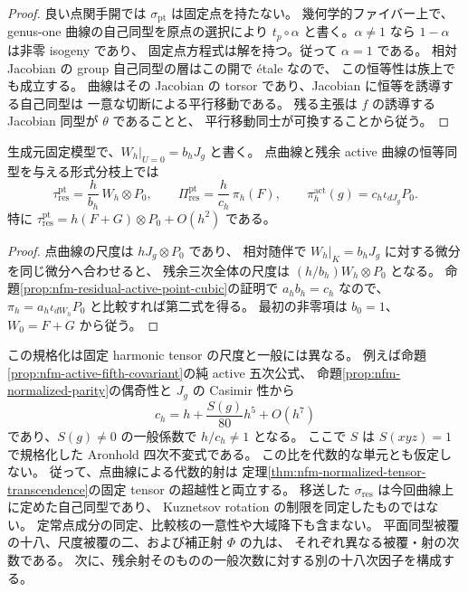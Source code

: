 \begin{proof}
良い点関手開では $\sigma_{\mathrm{pt}}$ は固定点を持たない。
幾何学的ファイバー上で、genus-one 曲線の自己同型を原点の選択により
$t_p\circ\alpha$ と書く。$\alpha\ne1$ なら $1-\alpha$ は非零 isogeny であり、
固定点方程式は解を持つ。従って $\alpha=1$ である。
相対 Jacobian の group 自己同型の層はこの開で étale なので、
この恒等性は族上でも成立する。
曲線はその Jacobian の torsor であり、Jacobian に恒等を誘導する自己同型は
一意な切断による平行移動である。
残る主張は $f$ の誘導する Jacobian 同型が $\theta$ であることと、
平行移動同士が可換することから従う。
\end{proof}


\begin{proposition}
\label{prop:nfm-point-scale-formal-comparison}
生成元固定模型で、$W_h|_{U=0}=b_hJ_g$ と書く。
点曲線と残余 active 曲線の恒等同型を与える形式分枝上では
\begin{equation}\label{eq:nfm-point-scale-formal-leading}
 \tau_{\mathrm{res}}^{\mathrm{pt}}
    =\frac{h}{b_h}\,W_h\otimes P_0,
 \qquad
 \Pi_{\mathrm{res}}^{\mathrm{pt}}
    =\frac{h}{c_h}\,\pi_h(F),
 \qquad
 \pi_h^{\mathrm{act}}(g)=c_h\iota_{dJ_g}P_0.
\end{equation}
特に $\tau_{\mathrm{res}}^{\mathrm{pt}}=h(F+G)\otimes P_0+O(h^2)$ である。
\end{proposition}

\begin{proof}
点曲線の尺度は $hJ_g\otimes P_0$ であり、
相対随伴で $W_h|_K=b_hJ_g$ に対する微分を同じ微分へ合わせると、
残余三次全体の尺度は $(h/b_h)W_h\otimes P_0$ となる。
命題\ref{prop:nfm-residual-active-point-cubic}の証明で
$a_hb_h=c_h$ なので、$\pi_h=a_h\iota_{dW_h}P_0$ と比較すれば第二式を得る。
最初の非零項は $b_0=1$、$W_0=F+G$ から従う。
\end{proof}

この規格化は固定 harmonic tensor の尺度と一般には異なる。
例えば命題\ref{prop:nfm-active-fifth-covariant}の純 active 五次公式、
命題\ref{prop:nfm-normalized-parity}の偶奇性と $J_g$ の Casimir 性から
\[
 c_h=h+\frac{S(g)}{80}h^5+O(h^7)
\]
であり、$S(g)\ne0$ の一般係数で $h/c_h\ne1$ となる。
ここで $S$ は $S(xyz)=1$ で規格化した Aronhold 四次不変式である。
この比を代数的な単元とも仮定しない。
従って、点曲線による代数的射は
定理\ref{thm:nfm-normalized-tensor-transcendence}の固定 tensor の超越性と両立する。
移送した $\sigma_{\mathrm{res}}$ は今回曲線上に定めた自己同型であり、
Kuznetsov rotation の制限を同定したものではない。
定常点成分の同定、比較核の一意性や大域降下も含まない。
平面同型被覆の十八、尺度被覆の二、および補正射 $\Phi$ の九は、
それぞれ異なる被覆・射の次数である。
次に、残余射そのものの一般次数に対する別の十八次因子を構成する。


